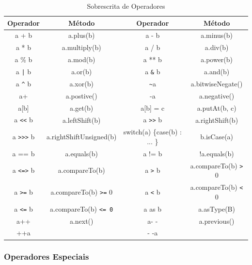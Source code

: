 \documentclass[12pt]{article}
\begin{document}
    \begin{table}[h]
        \centering
        \caption{Sobrescrita de Operadores}
        \label{tab:OperatorDefinition}
        \begin{tabular}{| c | c | c | c |}
        \hline
        {\bf Operador} & {\bf Método} & {\bf Operador} & {\bf Método} \\
        \hline
             a + b &  a.plus(b) & a - b & a.minus(b) \\
        \hline
             a * b & a.multiply(b) & a / b &   a.div(b) \\
        \hline
            a \% b &   a.mod(b) &  a ** b & a.power(b) \\
        \hline
            a \texttt{|} b & a.or(b) & a \texttt{\&} b & a.and(b) \\
        \hline
            a \texttt{\^} b & a.xor(b) & \texttt{\~}a & a.bitwiseNegate() \\
        \hline
            a+ & a.postive() & -a & a.negative() \\
        \hline
            a[b] & a.get(b) & a[b] = c & a.putAt(b, c) \\
        \hline
            a \texttt{<<} b & a.leftShift(b) & a \texttt{>>} b & a.rightShift(b)\\ 
        \hline
            a \texttt{>>>} b & a.rightShiftUnsigned(b) & switch(a) \{case(b) : ... \} & b.isCase(a) \\
        \hline
            a == b & a.equals(b) & a != b & !a.equals(b) \\
        \hline
           a \texttt{<=>} b & a.compareTo(b) & a \texttt{>} b & a.compareTo(b) \texttt{>} 0 \\
        \hline
            a \texttt{>=} b & a.compareTo(b) \texttt{>=} 0 & a \texttt{<} b & a.compareTo(b) \texttt{<} 0 \\
        \hline
            a \texttt{<=} b & a.compareTo(b) \texttt{<= 0} & a as b & a.asType(B) \\
        \hline
            a++ & \multicolumn{ 1}{|c|}{a.next()} & a- - & \multicolumn{ 1}{|c|}{a.previous()} \\
            ++a & \multicolumn{ 1}{|c|}{} & - -a & \multicolumn{ 1}{|c|}{} \\
        \hline
        \end{tabular}  
    \end{table}

\subsubsection{Operadores Especiais}
\end{document}
